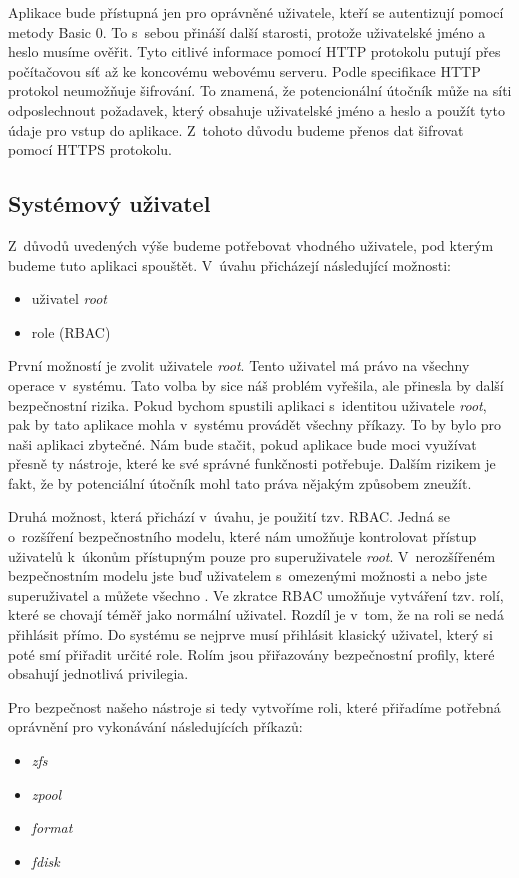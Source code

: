 Aplikace bude přístupná jen pro oprávněné uživatele, kteří se autentizují pomocí metody Basic 0. To s~sebou přináší další starosti, protože uživatelské jméno a heslo musíme ověřit. Tyto citlivé informace pomocí HTTP protokolu putují přes počítačovou síť až ke koncovému webovému serveru. Podle specifikace \cite{RFC2616} HTTP protokol neumožňuje šifrování. To znamená, že potencionální útočník může na síti odposlechnout požadavek, který obsahuje uživatelské jméno a heslo a použít tyto údaje pro vstup do aplikace. Z~tohoto důvodu budeme přenos dat šifrovat pomocí HTTPS protokolu.
    \subsection{Systémový uživatel}
    \label{sysuser}
    Z~důvodů uvedených výše budeme potřebovat vhodného uživatele, pod kterým budeme tuto aplikaci spouštět. V~úvahu přicházejí následující možnosti:
    \begin{itemize}
      \item uživatel \emph{root}
      \item role (RBAC)
    \end{itemize}

    První možností je zvolit uživatele \emph{root}. Tento uživatel má právo na všechny operace v~systému. Tato volba by sice náš problém vyřešila, ale přinesla by další bezpečnostní rizika. Pokud bychom spustili aplikaci s~identitou uživatele \emph{root}, pak by tato aplikace mohla v~systému provádět všechny příkazy. To by bylo pro naši aplikaci zbytečné. Nám bude stačit, pokud aplikace bude moci využívat přesně ty nástroje, které ke své správné funkčnosti potřebuje. Dalším rizikem je fakt, že by potenciální útočník mohl tato práva nějakým způsobem zneužít.

    Druhá možnost, která přichází v~úvahu, je použití tzv. RBAC. Jedná se o~rozšíření bezpečnostního modelu, které nám umožňuje kontrolovat přístup uživatelů k~úkonům přístupným pouze pro superuživatele \emph{root}. V~nerozšířeném bezpečnostním modelu jste buď uživatelem s~omezenými možnosti a nebo jste superuživatel a můžete všechno \cite{RBAC}. Ve zkratce RBAC umožňuje vytváření tzv. rolí, které se chovají téměř jako normální uživatel. Rozdíl je v~tom, že na roli se nedá přihlásit přímo. Do systému se nejprve musí přihlásit klasický uživatel, který si poté smí přiřadit určité role. Rolím jsou přiřazovány bezpečnostní profily, které obsahují jednotlivá privilegia.

    Pro bezpečnost našeho nástroje si tedy vytvoříme roli, které přiřadíme potřebná oprávnění pro vykonávání následujících příkazů:
    \begin{itemize}
      \item \emph{zfs}
      \item \emph{zpool}
      \item \emph{format}
      \item \emph{fdisk}
    \end{itemize}

